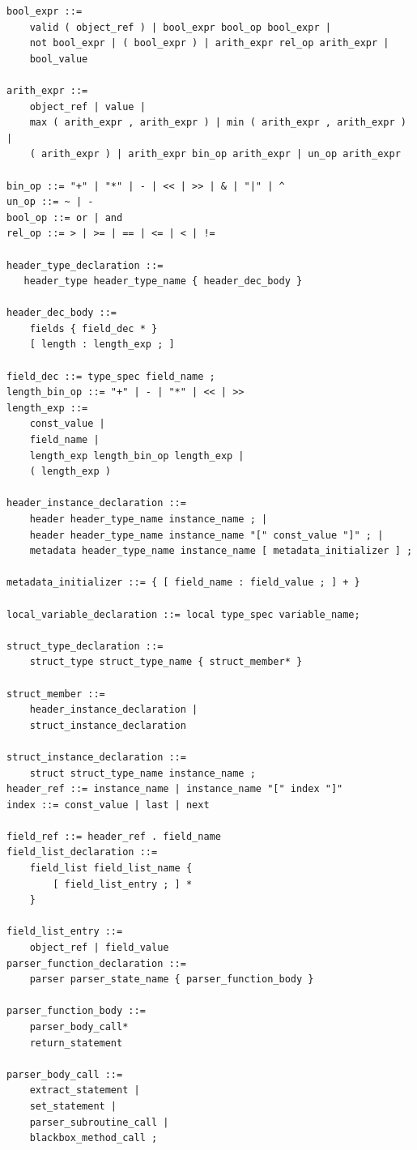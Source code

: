 \documentclass[12pt]{article}
\begin{document}
\begin{lstlisting}[style=BNFstyle]
bool_expr ::=
    valid ( object_ref ) | bool_expr bool_op bool_expr |
    not bool_expr | ( bool_expr ) | arith_expr rel_op arith_expr |
    bool_value

arith_expr ::=
    object_ref | value | 
    max ( arith_expr , arith_expr ) | min ( arith_expr , arith_expr ) |
    ( arith_expr ) | arith_expr bin_op arith_expr | un_op arith_expr

bin_op ::= "+" | "*" | - | << | >> | & | "|" | ^
un_op ::= ~ | -
bool_op ::= or | and
rel_op ::= > | >= | == | <= | < | !=

header_type_declaration ::= 
   header_type header_type_name { header_dec_body }

header_dec_body ::=
    fields { field_dec * }
    [ length : length_exp ; ]

field_dec ::= type_spec field_name ;
length_bin_op ::= "+" | - | "*" | << | >>
length_exp ::=
    const_value |
    field_name |
    length_exp length_bin_op length_exp |
    ( length_exp )

header_instance_declaration ::=
    header header_type_name instance_name ; |
    header header_type_name instance_name "[" const_value "]" ; |
    metadata header_type_name instance_name [ metadata_initializer ] ;

metadata_initializer ::= { [ field_name : field_value ; ] + }

local_variable_declaration ::= local type_spec variable_name;

struct_type_declaration ::=
    struct_type struct_type_name { struct_member* }

struct_member ::=
    header_instance_declaration |
    struct_instance_declaration

struct_instance_declaration ::=
    struct struct_type_name instance_name ;
header_ref ::= instance_name | instance_name "[" index "]"
index ::= const_value | last | next

field_ref ::= header_ref . field_name
field_list_declaration ::=
    field_list field_list_name {
        [ field_list_entry ; ] *
    }

field_list_entry ::= 
    object_ref | field_value
parser_function_declaration ::=
    parser parser_state_name { parser_function_body }

parser_function_body ::=
    parser_body_call*
    return_statement

parser_body_call ::= 
    extract_statement |
    set_statement |
    parser_subroutine_call |
    blackbox_method_call ;


\end{lstlisting}
\end{document}
